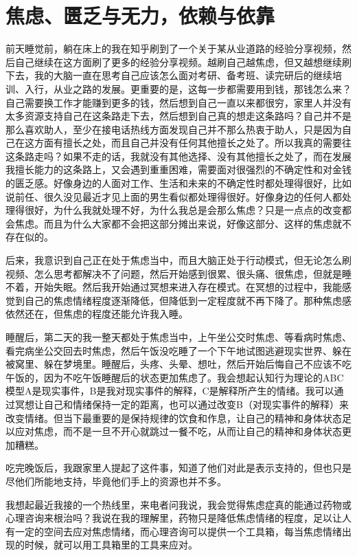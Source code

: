\chapter{焦虑、匮乏与无力，依赖与依靠}




前天睡觉前，躺在床上的我在知乎刷到了一个关于某从业道路的经验分享视频，然后自己继续在这方面刷了更多的经验分享视频。越刷自己越焦虑，但又越想继续刷下去，我的大脑一直在思考自己应该怎么面对考研、备考班、读完研后的继续培训、入行，从业之路的发展。更重要的是，这每一步都需要用到钱，那钱怎么来？自己需要换工作才能赚到更多的钱，然后想到自己一直以来都很穷，家里人并没有太多资源支持自己在这条路走下去，然后想到自己真的想走这条路吗？自己并不是那么喜欢助人，至少在接电话热线方面发现自己并不那么热衷于助人，只是因为自己在这方面有擅长之处，而且自己并没有任何其他擅长之处了。所以我真的需要往这条路走吗？如果不走的话，我就没有其他选择、没有其他擅长之处了，而在发展我擅长能力的这条路上，又会遇到重重困难，需要面对很强烈的不确定性和对金钱的匮乏感。好像身边的人面对工作、生活和未来的不确定性时都处理得很好，比如说前任、很久没见最近才见上面的男生看似都处理得很好。好像身边的任何人都处理得很好，为什么我就处理不好，为什么我总是会那么焦虑？只是一点点的改变都会焦虑。而且为什么大家都不会把这部分摊出来说，好像这部分、这样的焦虑就不存在似的。

后来，我意识到自己正在处于焦虑当中，而且大脑正处于行动模式，但无论怎么刷视频、怎么思考都解决不了问题，然后开始感到很累、很头痛、很焦虑，但就是睡不着，开始失眠。然后我开始通过冥想来进入存在模式。在冥想的过程中，我能感觉到自己的焦虑情绪程度逐渐降低，但降低到一定程度就不再下降了。那种焦虑感依然还在，但焦虑的程度还能允许我入睡。

睡醒后，第二天的我一整天都处于焦虑当中，上午坐公交时焦虑、等看病时焦虑、看完病坐公交回去时焦虑，然后午饭没吃睡了一个下午地试图逃避现实世界、躲在被窝里、躲在梦境里。睡醒后，头疼、头晕、想吐，然后开始后悔自己不应该不吃午饭的，因为不吃午饭睡醒后的状态更加焦虑了。我会想起认知行为理论的ABC模型\pozhehao{}A是现实事件，B是我对现实事件的解释，C是解释所产生的情绪。我可以通过冥想让自己和情绪保持一定的距离，也可以通过改变B（对现实事件的解释）来改变情绪。但当下最重要的是保持规律的饮食和作息，让自己的精神和身体状态足以应对焦虑，而不是一旦不开心就跳过一餐不吃，从而让自己的精神和身体状态更加糟糕。

吃完晚饭后，我跟家里人提起了这件事，知道了他们对此是表示支持的，但也只是尽他们所能地支持，毕竟他们手上的资源也并不多。

我想起最近我接的一个热线里，来电者问我说，我会觉得焦虑症真的能通过药物或心理咨询来根治吗？我说在我的理解里，药物只是降低焦虑情绪的程度，足以让人有一定的空间去应对焦虑情绪，而心理咨询可以提供一个工具箱，每当焦虑情绪出现的时候，就可以用工具箱里的工具来应对。

